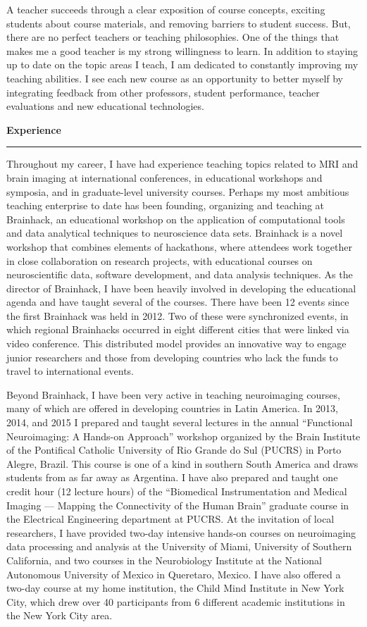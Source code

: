 \documentclass[letterpaper,11pt]{article}
\begin{document}
A teacher succeeds through a clear exposition of course concepts, exciting students about course materials, and removing barriers to student success. But, there are no perfect teachers or teaching philosophies. One of the things that makes me a good teacher is my strong willingness to learn. In addition to staying up to date on the topic areas I teach, I am dedicated to constantly improving my teaching abilities. I see each new course as an opportunity to better myself by integrating feedback from other professors, student performance, teacher evaluations and new educational technologies.

\textbf{\Large{Experience}} \smallskip \hrule \medskip

Throughout my career, I have had experience teaching topics related to MRI and brain imaging at international conferences, in educational workshops and symposia, and in graduate-level university courses. Perhaps my most ambitious teaching enterprise to date has been founding, organizing and teaching at Brainhack, an educational workshop on the application of computational tools and data analytical techniques to neuroscience data sets. Brainhack is a novel workshop that combines elements of hackathons, where attendees work together in close collaboration on research projects, with educational courses on neuroscientific data, software development, and data analysis techniques. As the director of Brainhack, I have been heavily involved in developing the educational agenda and have taught several of the courses. There have been 12 events since the first Brainhack was held in 2012. Two of these were synchronized events, in which regional Brainhacks occurred in eight different cities that were linked via video conference. This distributed model provides an innovative way to engage junior researchers and those from developing countries who lack the funds to travel to international events.

Beyond Brainhack, I have been very active in teaching neuroimaging courses, many of which are offered in developing countries in Latin America. In 2013, 2014, and 2015 I prepared and taught several lectures in the annual ``Functional Neuroimaging: A Hands-on Approach'' workshop organized by the Brain Institute of the Pontifical Catholic University of Rio Grande do Sul (PUCRS) in Porto Alegre, Brazil. This course is one of a kind in southern South America and draws students from as far away as Argentina. I have also prepared and taught one credit hour (12 lecture hours) of the ``Biomedical Instrumentation and Medical Imaging — Mapping the Connectivity of the Human Brain'' graduate course in the Electrical Engineering department at PUCRS. At the invitation of local researchers, I have provided two-day intensive hands-on courses on neuroimaging data processing and analysis at the University of Miami, University of Southern California, and two courses in the Neurobiology Institute at the National Autonomous University of Mexico in Queretaro, Mexico. I have also offered a two-day course at my home institution, the Child Mind Institute in New York City, which drew over 40 participants from 6 different academic institutions in the New York City area.
\end{document}
